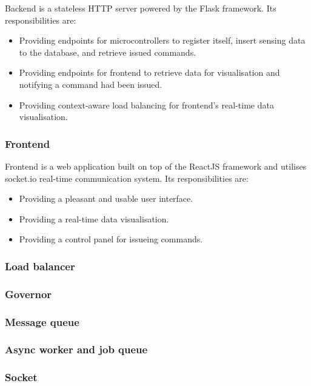 \documentclass[../thesis.tex]{subfiles}
\begin{document}
Backend is a stateless HTTP server powered by the Flask framework. Its responsibilities are:

\begin{itemize}
	\item Providing endpoints for microcontrollers to register itself, insert sensing data to the database, and retrieve issued commands.
	\item Providing endpoints for frontend to retrieve data for visualisation and notifying a command had been issued.
	\item Providing context-aware load balancing for frontend's real-time data visualisation. 
\end{itemize}

\subsubsection{Frontend}

Frontend is a web application built on top of the ReactJS framework and utilises socket.io real-time communication system. Its responsibilities are: 

\begin{itemize}
	\item Providing a pleasant and usable user interface.
	\item Providing a real-time data visualisation.
	\item Providing a control panel for issueing commands.
\end{itemize}

\subsubsection{Load balancer}

\subsubsection{Governor}

\subsubsection{Message queue}
\subsubsection{Async worker and job queue}

\subsubsection{Socket}
\end{document}
